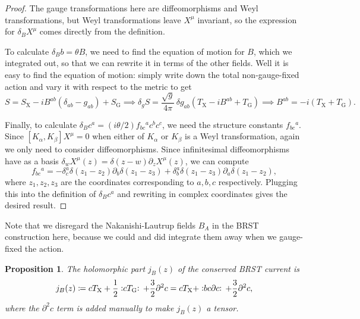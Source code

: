 \documentclass{report}
\theoremstyle{plain}
\newtheorem{proposition}[theorem]{Proposition}
\theoremstyle{definition}
\theoremstyle{remark}
\newcommand{\di}{\partial}
\newcommand{\NO}[1]{\vcentcolon\mathrel{#1}\vcentcolon\,}
\begin{document}
\begin{proof}
  The gauge transformations here are diffeomorphisms and Weyl
  transformations, but Weyl transformations leave $X^\mu$ invariant,
  so the expression for $\delta_B X^\mu$ comes directly from the
  definition.

  To calculate $\delta_B b = \theta B$, we need to find the equation
  of motion for $B$, which we integrated out, so that we can rewrite
  it in terms of the other fields. Well it is easy to find the
  equation of motion: simply write down the total non-gauge-fixed
  action and vary it with respect to the metric to get
  \[ S = S_{\text{X}} - iB^{ab}(\delta_{ab} - g_{ab}) + S_{\text{G}} \implies \delta_g S = \frac{\sqrt{g}}{4\pi} \, \delta g_{ab}(T_{\text{X}} - iB^{ab} + T_{\text{G}}) \implies B^{ab} = -i(T_{\text{X}} + T_{\text{G}}). \]

  Finally, to calculate $\delta_B c^a = (i\theta/2) f_{bc}{}^a c^b
  c^c$, we need the structure constants $f_{bc}{}^a$. Since
  $[K_\alpha, K_\beta] X^\mu = 0$ when either of $K_\alpha$ or
  $K_\beta$ is a Weyl transformation, again we only need to consider
  diffeomorphisms. Since infinitesimal diffeomorphisms have as a basis
  $\delta_w X^\mu(z) = \delta(z - w) \di_z X^\mu(z)$, we can compute
  \[ f_{bc}{}^a = -\delta_c^a \delta(z_1 - z_2) \di_b \delta(z_1 - z_3) + \delta_b^a \delta(z_1 - z_3) \di_a \delta(z_1 - z_2), \]
  where $z_1, z_2, z_3$ are the coordinates corresponding to $a, b, c$
  respectively. Plugging this into the definition of $\delta_B c^a$
  and rewriting in complex coordinates gives the desired result.
\end{proof}

Note that we disregard the Nakanishi-Lautrup fields $B_A$ in the BRST
construction here, because we could and did integrate them away when
we gauge-fixed the action.

\begin{proposition}
  The holomorphic part $j_B(z)$ of the conserved BRST current is
  \[ j_B(z) \coloneqq c T_{\text{X}} + \frac{1}{2} \NO{c T_{\text{G}}} + \frac{3}{2} \di^2 c = c T_{\text{X}} + \NO{bc\di c} + \frac{3}{2} \di^2 c, \]
  where the $\di^2 c$ term is added manually to make $j_B(z)$ a
  tensor.
\end{proposition}
\end{document}
